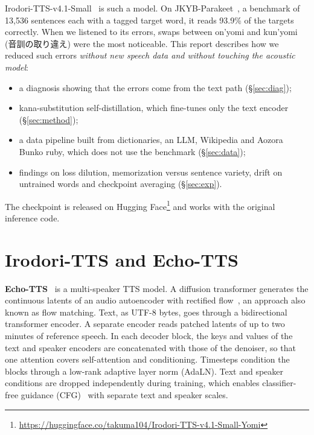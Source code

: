 \documentclass[10pt,a4paper,twocolumn]{article}
\begin{document}
Irodori-TTS-v4.1-Small~\cite{irodori} is such a model. On JKYB-Parakeet~\cite{jkyb,jkybp}, a
benchmark of 13,536 sentences each with a tagged target word, it reads 93.9\% of the targets
correctly. When we listened to its errors, swaps between on'yomi and kun'yomi (音訓の取り違え)
were the most noticeable. This report describes how we reduced such errors
\emph{without new speech data and without touching the acoustic model}:
\begin{itemize}
\item a diagnosis showing that the errors come from the text path (\S\ref{sec:diag});
\item kana-substitution self-distillation, which fine-tunes only the text encoder (\S\ref{sec:method});
\item a data pipeline built from dictionaries, an LLM, Wikipedia and Aozora Bunko ruby, which
  does not use the benchmark (\S\ref{sec:data});
\item findings on loss dilution, memorization versus sentence variety, drift on untrained words
  and checkpoint averaging (\S\ref{sec:exp}).
\end{itemize}
The checkpoint is released on Hugging Face\footnote{\url{https://huggingface.co/takuma104/Irodori-TTS-v4.1-Small-Yomi}}
and works with the original inference code.

\section{Irodori-TTS and Echo-TTS}\label{sec:arch}
\textbf{Echo-TTS}~\cite{echo} is a multi-speaker TTS model. A diffusion transformer generates
the continuous latents of an audio autoencoder with rectified flow~\cite{rf,fm}, an approach
also known as flow matching. Text, as UTF-8 bytes, goes through a bidirectional transformer
encoder. A separate encoder reads patched latents of up to two minutes of reference speech. In
each decoder block, the keys and values of the text and speaker encoders are concatenated with
those of the denoiser, so that one attention covers self-attention and conditioning. Timesteps
condition the blocks through a low-rank adaptive layer norm (AdaLN). Text and speaker
conditions are dropped independently during training, which enables classifier-free
guidance (CFG)~\cite{cfg} with separate text and speaker scales.
\end{document}

